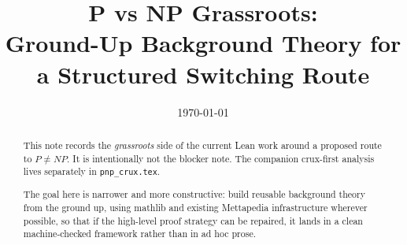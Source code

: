 \documentclass[11pt]{article}
\title{P vs NP Grassroots:\\
Ground-Up Background Theory for a Structured Switching Route}
\author{}
\date{\today}
\theoremstyle{remark}
\begin{document}
\maketitle

\begin{abstract}
This note records the \emph{grassroots} side of the current Lean work around a
proposed route to $P \neq NP$.  It is intentionally not the blocker note.
The companion crux-first analysis lives separately in \texttt{pnp\_crux.tex}.

The goal here is narrower and more constructive: build reusable background theory
from the ground up, using mathlib and existing Mettapedia infrastructure wherever
possible, so that if the high-level proof strategy can be repaired, it lands in a
clean machine-checked framework rather than in ad hoc prose.


\end{abstract}
\end{document}
